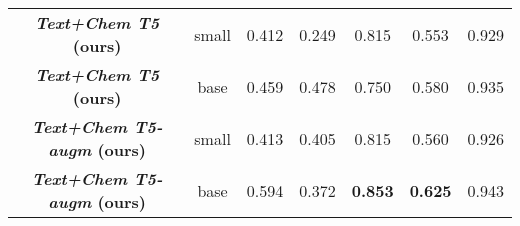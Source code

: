 \documentclass[nohyperref]{article}
\theoremstyle{plain}
\theoremstyle{definition}
\theoremstyle{remark}
\begin{document}
\begin{table*}[ht]
{\begin{tabular}{cc | ccccc}
    \midrule
    \textbf{\emph{Text+Chem T5}  (ours)}             & small & 0.412  & 0.249  & 0.815 & 0.553 & 0.929 \\
    \textbf{\emph{Text+Chem T5}  (ours)}              & base  & 0.459  & 0.478  & 0.750 & 0.580 & 0.935 \\
    \textbf{\emph{Text+Chem T5-augm} (ours)}             & small & 0.413  & 0.405  & 0.815 & 0.560 & 0.926 \\
    \textbf{\emph{Text+Chem T5-augm} (ours)}              & base  & 0.594  & 0.372  & \textbf{0.853} & \textbf{0.625} & 0.943 \\
    \bottomrule
    \end{tabular}
    }
    \label{tab:experiments-main}
\end{table*}

\begin{table*}[ht]
\small
    \centering
    \caption{\textbf{Results of the SMILES to Caption ($\texttt{mol2text}$) task}. 
    The baselines include Transformer~\citep{edwards2022translation}, T5 (fine-tuned), and MolT5~\citep{edwards2022translation}. The metrics used in the table include BLEU-2, BLEU-4, Rouge-1, Rouge-2, Rouge-L, and Meteor, all of which are common metrics used to evaluate text generation models. The table shows that our proposed model, Text+Chem T5, outperforms the other baselines in all the metrics. Overall, \emph{Text+Chem T5}  is able to generate more accurate and informative captions for SMILES.
    }
\end{table*}
\end{document}
